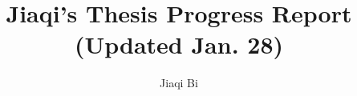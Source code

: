 \documentclass[preprint,12pt]{elsarticle}
\begin{document}
\begin{frontmatter}


\title{Jiaqi's Thesis Progress Report (Updated Jan. 28)}




\author[rvt]{Jiaqi Bi}

\address[rvt]{Western University, \\ Schulich School of Medicine \& Dentistry, \\ Department of Epidemiology and Biostatistics}





\end{frontmatter}
\end{document}
